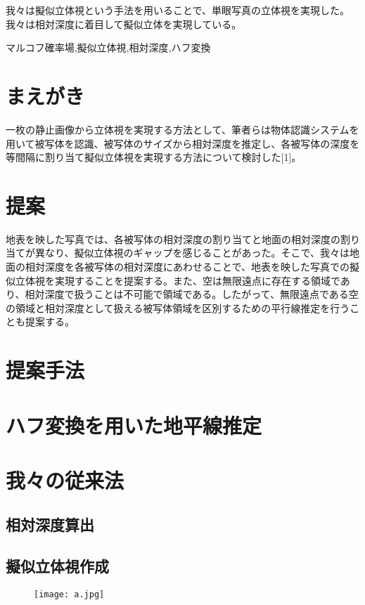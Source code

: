 \documentclass[technicalreport]{ieicej}
\begin{document}
\begin{jabstract}
我々は擬似立体視という手法を用いることで、単眼写真の立体視を実現した。我々は相対深度に着目して擬似立体を実現している。
\end{jabstract}
\begin{jkeyword}
マルコフ確率場,擬似立体視,相対深度,ハフ変換
\end{jkeyword}

\maketitle

\section{まえがき}

一枚の静止画像から立体視を実現する方法として、筆者らは物体認識システムを用いて被写体を認識、被写体のサイズから相対深度を推定し、各被写体の深度を等間隔に割り当て擬似立体視を実現する方法について検討した[1]。


\section{提案}
地表を映した写真では、各被写体の相対深度の割り当てと地面の相対深度の割り当てが異なり、擬似立体視のギャップを感じることがあった。そこで、我々は地面の相対深度を各被写体の相対深度にあわせることで、地表を映した写真での擬似立体視を実現することを提案する。また、空は無限遠点に存在する領域であり、相対深度で扱うことは不可能で領域である。したがって、無限遠点である空の領域と相対深度として扱える被写体領域を区別するための平行線推定を行うことも提案する。


\section{提案手法}

\section{ハフ変換を用いた地平線推定}

\section{我々の従来法}
\subsection{相対深度算出}
\subsection{擬似立体視作成}


\begin{figure}
\centering
\texttt{[image: a.jpg]}
\end{figure}


%
%
\begin{thebibliography}{99}%
\bibitem{}
\end{thebibliography}

\end{document}
